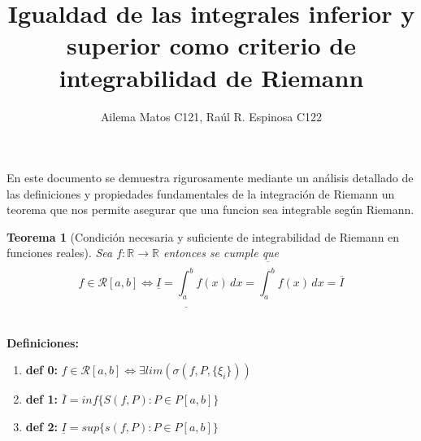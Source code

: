 \documentclass{article}
\title{Igualdad de las integrales inferior y superior como criterio de integrabilidad de Riemann}
\author{
Ailema Matos C121,
Raúl R. Espinosa C122 
}
\newtheorem{theorem}{Teorema}
\begin{document}
\maketitle

\section*{}

En este documento se demuestra rigurosamente mediante un análisis detallado de las definiciones y propiedades fundamentales de la integración de Riemann 
un teorema que nos permite asegurar que una funcion sea integrable según Riemann.\\

\begin{theorem}[Condición necesaria y suficiente de integrabilidad de Riemann en funciones reales]
Sea \( f: \mathbb{R} \to \mathbb{R} \) entonces se cumple que \[f \in \mathcal{R}[a, b] \Longleftrightarrow \underline{I} = \underline{\int_a^b} f(x) \, dx = \overline{\int_a^b} f(x) \, dx = \overline{I}\]\\
\end{theorem}

\textbf{Definiciones:}

\begin{enumerate}
   \item \textbf{def 0:} \(f \in \mathcal{R}[a, b] \Longleftrightarrow   \exists lim(\sigma(f, P,\{\xi_i\}))\)
    \item \textbf{def 1:}  \(\overline{I} = inf \{ S(f, P): P \in P[a, b] \} \)  
    \item \textbf{def 2:}  \(\underline{I} = sup\{ s(f, P): P \in P[a, b] \} \)
\end{enumerate} 
\end{document}

